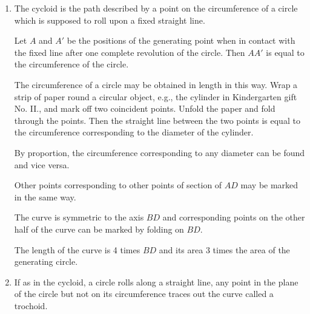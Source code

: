 \begin{enumerate}
%

\item The cycloid is the path described by a point on the circumference of a
    circle which is supposed to roll upon a fixed straight line.

    Let $A$ and $A'$ be the positions of the generating point when in contact
    with the fixed line after one complete revolution of the circle.  Then $AA'$
    is equal to the circumference of the circle.

    The circumference of a circle may be obtained in length in this way.  Wrap a
    strip of paper round a circular object, e.g., the cylinder in Kindergarten
    gift No. II., and mark off two coincident points.  Unfold the paper and
    fold through the points. Then the straight line between the two points is
    equal to the circumference corresponding to the diameter of the cylinder.


    By proportion, the circumference corresponding to any diameter can be found
    and vice versa.

%
%
%
%
%
%
%
%

    Other points corresponding to other points of section of $AD$ may be marked
    in the same way.

    The curve is symmetric to the axis $BD$ and corresponding points on the
    other half of the curve can be marked by folding on $BD$.

    The length of the curve is 4 times $BD$ and its area 3 times the area of the
    generating circle.



\item If as in the cycloid, a circle rolls along a straight line, any point in
    the plane of the circle but not on its circumference traces out the curve
    called a trochoid.



\end{enumerate}
